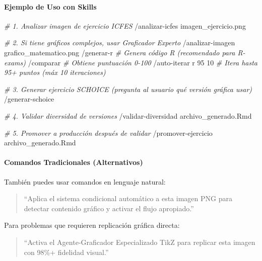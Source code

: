 \documentclass[
]{article}
\newenvironment{Shaded}{\begin{snugshade}}{\end{snugshade}}
\newcommand{\CommentTok}[1]{\textcolor[rgb]{0.56,0.35,0.01}{\textit{#1}}}
\newcommand{\ExtensionTok}[1]{#1}
\newcommand{\NormalTok}[1]{#1}
\begin{document}
\paragraph{\texorpdfstring{\textbf{Ejemplo de Uso con
Skills}}{Ejemplo de Uso con Skills}}\label{ejemplo-de-uso-con-skills}

\begin{Shaded}
\begin{Highlighting}[]
\CommentTok{\# 1. Analizar imagen de ejercicio ICFES}
\ExtensionTok{/analizar{-}icfes}\NormalTok{ imagen\_ejercicio.png}

\CommentTok{\# 2. Si tiene gráficos complejos, usar Graficador Experto}
\ExtensionTok{/analizar{-}imagen}\NormalTok{ grafico\_matematico.png}
\ExtensionTok{/generar{-}r}  \CommentTok{\# Genera código R (recomendado para R{-}exams)}
\ExtensionTok{/comparar}   \CommentTok{\# Obtiene puntuación 0{-}100}
\ExtensionTok{/auto{-}iterar}\NormalTok{ r 95 10  }\CommentTok{\# Itera hasta 95+ puntos (máx 10 iteraciones)}

\CommentTok{\# 3. Generar ejercicio SCHOICE (pregunta al usuario qué versión gráfica usar)}
\ExtensionTok{/generar{-}schoice}

\CommentTok{\# 4. Validar diversidad de versiones}
\ExtensionTok{/validar{-}diversidad}\NormalTok{ archivo\_generado.Rmd}

\CommentTok{\# 5. Promover a producción después de validar}
\ExtensionTok{/promover{-}ejercicio}\NormalTok{ archivo\_generado.Rmd}
\end{Highlighting}
\end{Shaded}

\paragraph{\texorpdfstring{\textbf{Comandos Tradicionales
(Alternativos)}}{Comandos Tradicionales (Alternativos)}}\label{comandos-tradicionales-alternativos}

También puedes usar comandos en lenguaje natural:

\begin{quote}
``Aplica el sistema condicional automático a esta imagen PNG para
detectar contenido gráfico y activar el flujo apropiado.''
\end{quote}

Para problemas que requieren replicación gráfica directa:

\begin{quote}
``Activa el Agente-Graficador Especializado TikZ para replicar esta
imagen con 98\%+ fidelidad visual.''
\end{quote}
\end{document}
